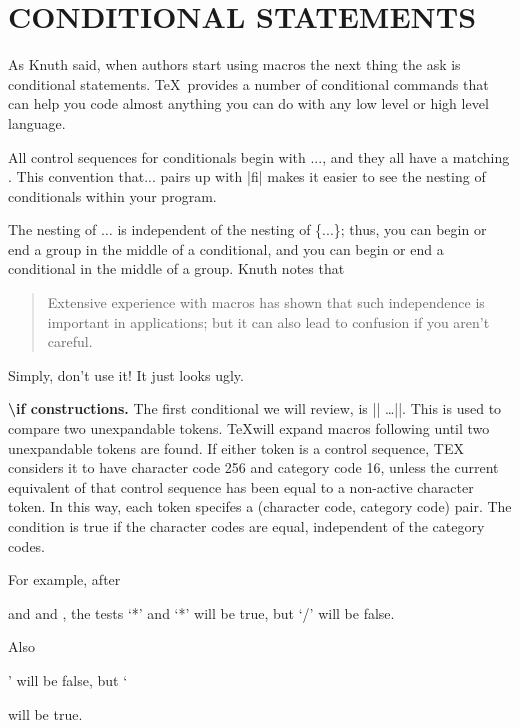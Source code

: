 \section*{CONDITIONAL STATEMENTS}

\begin{multicols}{2}
As Knuth said, when authors start using macros the next thing the ask is conditional statements.
\TeX\  provides a number of  conditional commands that can help you code almost anything you can do with any low level or high level language.

All  control sequences for conditionals begin with ...,
and they all have a matching . This convention that... pairs up
with |fi| makes it easier to see the nesting of conditionals within your program. 

The nesting of $\ldots$  is independent of the nesting of \{...\}; thus, you can begin or end
a group in the middle of a conditional, and you can begin or end a conditional in the
middle of a group. Knuth notes that

\begin{quotation}
Extensive experience with macros has shown that such independence
is important in applications; but it can also lead to confusion if you aren't careful.
\end{quotation}\sidenote{\TODO}

Simply, don't use it! It just looks ugly.



\textbf{\textbackslash if constructions.} \quad The first conditional we will review, is |\if| \ldots |\fi|. This is used to compare two unexpandable tokens. \TeX will expand macros following  until two unexpandable tokens are found. If
either token is a control sequence, TEX considers it to have character code 256 and
category code 16, unless the current equivalent of that control sequence has been 
  equal to a non-active character token. In this way, each token specifes a (character
code, category code) pair. The condition is true if the character codes are equal,
independent of the category codes.

 For example, after 
\end{multicols}

\begin{teXXX}
\def\a{*} and \let\b=* and \def\c{/}, 
the tests `\if*\a \fi' and `\if\a\b \fi' will be true, 
but `\if\a\c \fi' will be false.

Also \if\a\par\fi' will be false, 
but `\if\par\let \fi' will be true.

\end{teXXX}

